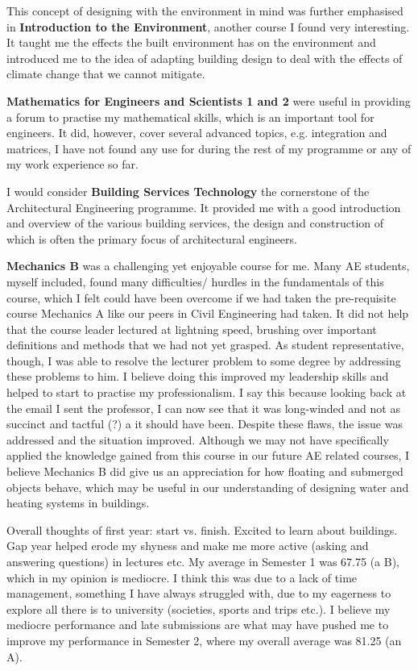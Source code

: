 This concept of designing with the environment in mind was further emphasised in \textbf{Introduction to the Environment}, another course I found very interesting.
It taught me the effects the built environment has on the environment and introduced me to the idea of adapting building design to deal with the effects of climate change that we cannot mitigate.

\textbf{Mathematics for Engineers and Scientists 1 and 2} were useful in providing a forum to practise my mathematical skills, which is an important tool for engineers.
It did, however, cover several advanced topics, e.g. integration and matrices, I have not found any use for during the rest of my programme or any of my work experience so far.

I would consider \textbf{Building Services Technology} the cornerstone of the Architectural Engineering programme.
It provided me with a good introduction and overview of the various building services, the design and construction of which is often the primary focus of architectural engineers.

\textbf{Mechanics B} was a challenging yet enjoyable course for me.
Many AE students, myself included, found many difficulties/ hurdles in the fundamentals of this course, which I felt could have been overcome if we had taken the pre-requisite course Mechanics A like our peers in Civil Engineering had taken.
It did not help that the course leader lectured at lightning speed, brushing over important definitions and methods that we had not yet grasped.
As student representative, though, I was able to resolve the lecturer problem to some degree by addressing these problems to him.
I believe doing this improved my leadership skills and helped to start to practise my professionalism.
I say this because looking back at the email I sent the professor, I can now see that it was long-winded and not as succinct and tactful (?) a it should have been.
Despite these flaws, the issue was addressed and the situation improved.
Although we may not have specifically applied the knowledge gained from this course in our future AE related courses, I believe Mechanics B did give us an appreciation for how floating and submerged objects behave, which may be useful in our understanding of designing water and heating systems in buildings.

Overall thoughts of first year: start vs. finish.
Excited to learn about buildings.
Gap year helped erode my shyness and make me more active (asking and answering questions) in lectures etc.
My average in Semester 1 was 67.75 (a B), which in my opinion is mediocre.
I think this was due to a lack of time management, something I have always struggled with, due to my eagerness to explore all there is to university (societies, sports and trips etc.).
I believe my mediocre performance and late submissions are what may have pushed me to improve my performance in Semester 2, where my overall average was 81.25 (an A).


